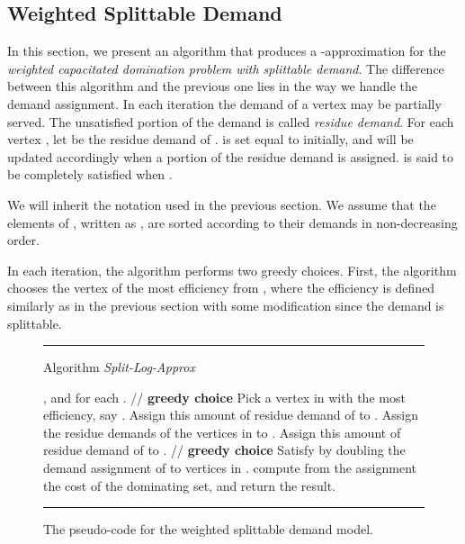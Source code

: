 \documentclass[a4paper,11pt]{article}
\theoremstyle{definition}
\begin{document}
\subsection{Weighted Splittable Demand} \label{section_weighted_splittable}

In this section, we
present an algorithm that produces a -approximation for
the {\em weighted capacitated domination problem with splittable
demand}. The difference between this algorithm and the previous one lies in the way we handle the demand assignment.  In each iteration the demand of a vertex may be partially served. 
The unsatisfied portion of the demand is called {\it residue demand}. For each vertex , let  be the residue demand of .  is set equal to  initially, and will be updated accordingly when a portion of the residue demand is assigned.  is said to be completely satisfied when .

\smallskip

We will inherit the notation used in the previous
section. We assume that the elements of ,
written as , are sorted according to
their demands in non-decreasing order.

\smallskip

In each iteration, the algorithm performs two greedy choices. First, the
algorithm chooses the vertex of the most efficiency from , where
the efficiency is defined similarly as in the previous section with some modification since the demand is splittable.

\begin{figure*}[t]
\rule{\linewidth}{0.2mm}
\medskip
{{\sc Algorithm} {\em Split-Log-Approx}}

\begin{algorithmic}[1]
\STATE , and  for each .
    \STATE // {\bf  greedy choice}
    \STATE Pick a vertex in  with the most efficiency, say .
        \STATE Assign this amount  of residue demand of  to .
        \STATE 
    \ELSE
        \STATE Assign the residue demands of the vertices in  to .
        \IF{}
            \STATE Assign this amount  of residue demand of  to .
            \STATE 
        \ENDIF
    \ENDIF
    \STATE
    \STATE // {\bf  greedy choice}
        \STATE Satisfy  by doubling the demand assignment of  to vertices in .
    \ENDIF
\ENDWHILE
\STATE compute from the assignment the cost of the dominating set, and return the result.

\end{algorithmic}
\rule{\linewidth}{0.2mm} \caption{The pseudo-code for the 
weighted splittable demand model.} \label{Algorithm for
Weighted Splittable Demand}
\end{figure*}
\end{document}
